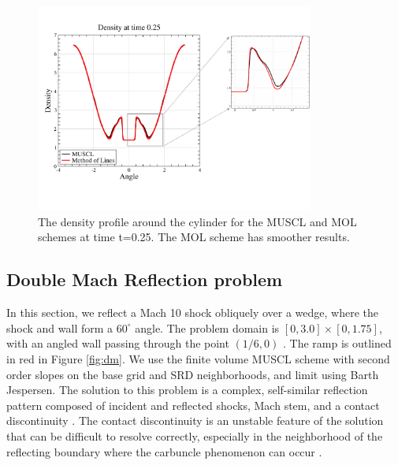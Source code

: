 \begin{figure}
\begin{center}
\hspace*{-.5in}
\includegraphics[height=2.7in]{figs/MM_densityBndry.pdf}
\hspace*{.3in}
\caption{\sf The density profile  around the cylinder for the MUSCL and MOL schemes 
at time t=0.25.  The MOL scheme has smoother results.}
\label{fig:cylbndry}
\end{center}
\end{figure}

\clearpage

\subsection{Double Mach Reflection problem}\label{sec:dm}
In this section, we reflect a Mach 10 shock obliquely over a wedge, 
where the shock and wall form a $60^{\circ}$ angle.  
The problem domain is $[0,3.0]\times[0,1.75]$, with an angled wall 
passing through the point $(1/6,0)$ . The ramp is outlined in red in Figure
\ref{fig:dm}.
We use the finite volume MUSCL scheme with second order slopes on the base 
grid and SRD neighborhoods, and limit using Barth Jespersen.
The solution to this problem is a complex, self-similar reflection pattern 
composed of incident and reflected shocks, Mach stem, and a contact 
discontinuity \cite{WOODWARD1984115,rkdg5}.  
The contact discontinuity is an unstable feature of the solution that can be 
difficult to resolve correctly, especially in the neighborhood of the 
reflecting boundary where the carbuncle phenomenon can occur \cite{KEMM2018596}.

